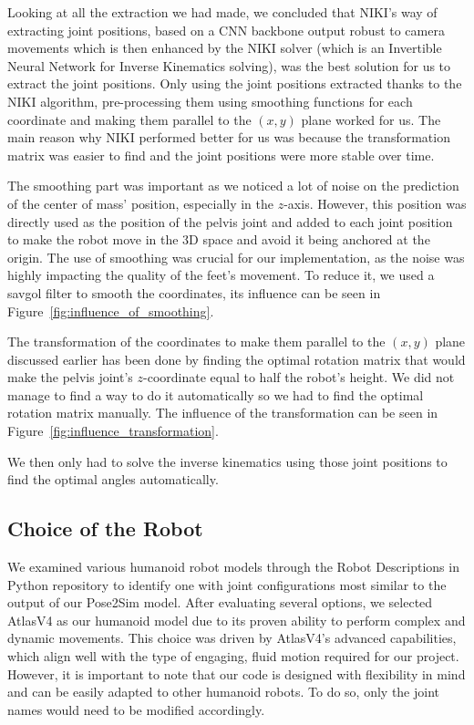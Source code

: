 \documentclass{amsart}
\theoremstyle{definition}
\theoremstyle{plain}
\begin{document}
Looking at all the extraction we had made, we concluded that NIKI's way of extracting joint positions, based on a CNN backbone output robust to camera movements which is then enhanced by the NIKI solver (which is an Invertible Neural Network for Inverse Kinematics solving), was the best solution for us to extract the joint positions. Only using the joint positions extracted thanks to the NIKI algorithm, pre-processing them using smoothing functions for each coordinate and making them parallel to the $(x, y)$ plane worked for us. The main reason why NIKI performed better for us was because the transformation matrix was easier to find and the joint positions were more stable over time.

The smoothing part was important as we noticed a lot of noise on the prediction of the center of mass' position, especially in the $z$-axis. However, this position was directly used as the position of the pelvis joint and added to each joint position to make the robot move in the 3D space and avoid it being anchored at the origin. The use of smoothing was crucial for our implementation, as the noise was highly impacting the quality of the feet's movement. To reduce it, we used a savgol filter to smooth the coordinates, its influence can be seen in Figure~\ref{fig:influence_of_smoothing}.

The transformation of the coordinates to make them parallel to the $(x, y)$ plane discussed earlier has been done by finding the optimal rotation matrix that would make the pelvis joint's $z$-coordinate equal to half the robot's height. We did not manage to find a way to do it automatically so we had to find the optimal rotation matrix manually. The influence of the transformation can be seen in Figure~\ref{fig:influence_transformation}.

We then only had to solve the inverse kinematics using those joint positions to find the optimal angles automatically.

\subsection{Choice of the Robot}

We examined various humanoid robot models through the Robot Descriptions in Python repository \cite{robot_descriptions_py} to identify one with joint configurations most similar to the output of our Pose2Sim model. After evaluating several options, we selected AtlasV4 as our humanoid model due to its proven ability to perform complex and dynamic movements. This choice was driven by AtlasV4's advanced capabilities, which align well with the type of engaging, fluid motion required for our project. However, it is important to note that our code is designed with flexibility in mind and can be easily adapted to other humanoid robots. To do so, only the joint names would need to be modified accordingly.
\end{document}
